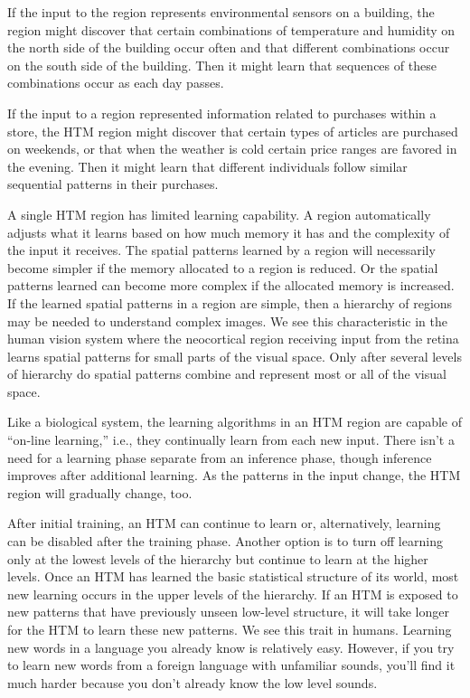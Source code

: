 \documentclass{report}
\begin{document}
If the input to the region represents environmental sensors on a
building, the region might discover that certain combinations of
temperature and humidity on the north side of the building occur often
and that different combinations occur on the south side of the
building. Then it might learn that sequences of these combinations
occur as each day passes.

If the input to a region represented information related to purchases
within a store, the HTM region might discover that certain types of
articles are purchased on weekends, or that when the weather is cold
certain price ranges are favored in the evening. Then it might learn
that different individuals follow similar sequential patterns in their
purchases.

A single HTM region has limited learning capability. A region
automatically adjusts what it learns based on how much memory it has
and the complexity of the input it receives. The spatial patterns
learned by a region will necessarily become simpler if the memory
allocated to a region is reduced. Or the spatial patterns learned can
become more complex if the allocated memory is increased. If the
learned spatial patterns in a region are simple, then a hierarchy of
regions may be needed to understand complex images. We see this
characteristic in the human vision system where the neocortical region
receiving input from the retina learns spatial patterns for small
parts of the visual space. Only after several levels of hierarchy do
spatial patterns combine and represent most or all of the visual
space.

Like a biological system, the learning algorithms in an HTM region are
capable of ``on-line learning,'' i.e., they continually learn from each
new input. There isn't a need for a learning phase separate from an
inference phase, though inference improves after additional
learning. As the patterns in the input change, the HTM region will
gradually change, too.

After initial training, an HTM can continue to learn or,
alternatively, learning can be disabled after the training
phase. Another option is to turn off learning only at the lowest
levels of the hierarchy but continue to learn at the higher
levels. Once an HTM has learned the basic statistical structure of its
world, most new learning occurs in the upper levels of the
hierarchy. If an HTM is exposed to new patterns that have previously
unseen low-level structure, it will take longer for the HTM to learn
these new patterns. We see this trait in humans. Learning new words in
a language you already know is relatively easy. However, if you try to
learn new words from a foreign language with unfamiliar sounds, you'll
find it much harder because you don't already know the low level
sounds.
\end{document}
